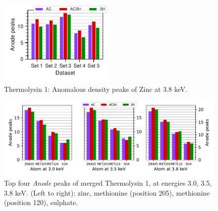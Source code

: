 \begin{figure}
    \centering
    \includegraphics[width = 0.5\textwidth]{plots/exp1/tlys_9_P6122/peaks/3p8_zinc.pdf}
    \caption{Thermolysin 1: Anomalous density peaks of Zinc at 3.8 \unit{keV}.}
    \label{fig:tlys9_zn_peaks_3p8}
\end{figure}


\begin{figure}[h]
    \centering
    \includegraphics[width = 1.0 \textwidth]{plots/exp1/tlys_9_P6122/peaks/merged_peaks_so4.pdf}
    \caption{Top four \textit{Anode} peaks of merged Thermolysin 1, at energies 3.0, 3.5, 3.8 \unit{keV}. (Left to right): zinc, methionine (position 205), methionine (position 120), sulphate.}
    \label{fig:tlys_9_merged_peaks}
\end{figure}




